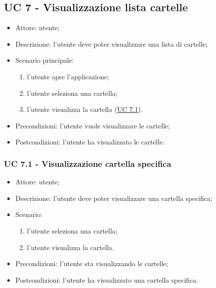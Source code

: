     \subsection{UC 7 - Visualizzazione lista cartelle}
    \begin{itemize}
        \item Attore: utente;
        \item Descrizione: l'utente deve poter visualizzare una lista di cartelle;
        \item Scenario principale:
            \begin{enumerate}
            \item l'utente apre l'applicazione;
            \item l'utente seleziona una cartella;
            \item l'utente visualizza la cartella (\hyperref[sec: UC 7.1]{UC 7.1}).
            \end{enumerate}
        \item Precondizioni: l'utente vuole visualizzare le cartelle;
        \item Postcondizioni: l'utente ha visualizzato le cartelle.
    \end{itemize}
    \subsubsection{UC 7.1 - Visualizzazione cartella specifica} \label{sec: UC 7.1}
    \begin{itemize}
        \item Attore: utente;
        \item Descrizione: l'utente deve poter visualizzare una cartella specifica;
        \item Scenario:
        \begin{enumerate}
        \item l'utente seleziona una cartella;
        \item l'utente visualizza la cartella.
        \end{enumerate}
        \item Precondizioni: l'utente sta visualizzando le cartelle;
        \item Postcondizioni: l'utente ha visualizzato una cartella specifica.
    \end{itemize}

